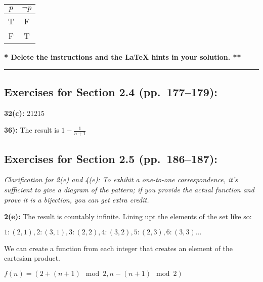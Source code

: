 \documentclass[12pt]{article}  %
\newcommand{\NOT}{\neg}
\begin{document}
\begin{center}
\begin{tabular}{|c|c|}  %
\hline                  %
$p$ & $\NOT p$ \\       %
\hline
\hline
T & F \\
\hline
F & T \\
\hline
\end{tabular}
\end{center}

{\bf ** Delete the instructions and the LaTeX hints in your solution. **}

\rule{6in}{.1pt}       %


\subsection*{Exercises for Section 2.4 (pp.\ 177--179):}     

\noindent
{\bf 32(c):}
21215

\noindent
{\bf 36):}
The result is $1 - \frac{1}{n+1}$


\subsection*{Exercises for Section 2.5 (pp.\ 186--187):}     

{\em Clarification for 2(e) and 4(e):
To exhibit a one-to-one correspondence, it's sufficient
to give a diagram of the pattern; if you provide the actual function
and prove it is a bijection, you can get extra credit.}

\noindent
{\bf 2(e):}
The result is countably infinite. Lining upt the elements of the set like so:
\\
\begin{center}
$1: (2, 1), 2: (3, 1), 3: (2, 2), 4: (3, 2), 5: (2, 3), 6: (3, 3) ...$
\end{center}
We can create a function from each integer that creates an element of the cartesian product.
\begin{center}
$f(n) = (2 + (n + 1) \mod{2}, n - (n + 1) \mod{2})$
\end{center}
\end{document}
